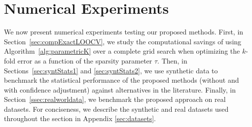 \documentclass[mnsc,nonblindrev]{informs3} %
\begin{document}
\section{Numerical Experiments}\label{sec:numres} 

We now present numerical experiments testing our proposed methods. First, in Section~\ref{sec:compExactLOOCV}, we study the computational savings of using Algorithm~\ref{alg:parametricK} over a complete grid search when optimizing the $k$-fold error as a function of the sparsity parameter $\tau$. Then, in Sections~\ref{sec:syntStats1} and \ref{sec:syntStats2}, we use synthetic data to benchmark the statistical performance of the proposed methods (without and with confidence adjustment) against alternatives in the literature. Finally, in Section~\ref{ssec:realworldata}, we benchmark the proposed approach on real datasets. For conciseness, we describe the synthetic and real datasets used throughout the section in Appendix \ref{sec:datasets}.
\end{document}
